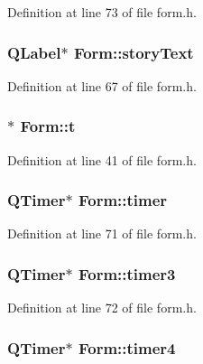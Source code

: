 Definition at line 73 of file form.h.\hypertarget{class_form_a4fda691b1a4b71eb73fe89d055e9b651}{
\subsubsection[{storyText}]{\setlength{\rightskip}{0pt plus 5cm}QLabel$\ast$ {\bf Form::storyText}}}
\label{class_form_a4fda691b1a4b71eb73fe89d055e9b651}


Definition at line 67 of file form.h.\hypertarget{class_form_ac44e1693a46054cf0ba47b7c03d397f6}{
\subsubsection[{t}]{$\ast$ {\bf Form::t}}}
\label{class_form_ac44e1693a46054cf0ba47b7c03d397f6}


Definition at line 41 of file form.h.\hypertarget{class_form_a07118dfb7566e4baf43c182ecd378481}{
\subsubsection[{timer}]{\setlength{\rightskip}{0pt plus 5cm}QTimer$\ast$ {\bf Form::timer}}}
\label{class_form_a07118dfb7566e4baf43c182ecd378481}


Definition at line 71 of file form.h.\hypertarget{class_form_a9ef80826774356f54f6d056ef48cce52}{
\subsubsection[{timer3}]{\setlength{\rightskip}{0pt plus 5cm}QTimer$\ast$ {\bf Form::timer3}}}
\label{class_form_a9ef80826774356f54f6d056ef48cce52}


Definition at line 72 of file form.h.\hypertarget{class_form_a9c2c8ccb519f3ad5af95b8f6a47b8c85}{
\subsubsection[{timer4}]{\setlength{\rightskip}{0pt plus 5cm}QTimer$\ast$ {\bf Form::timer4}}}
\label{class_form_a9c2c8ccb519f3ad5af95b8f6a47b8c85}



